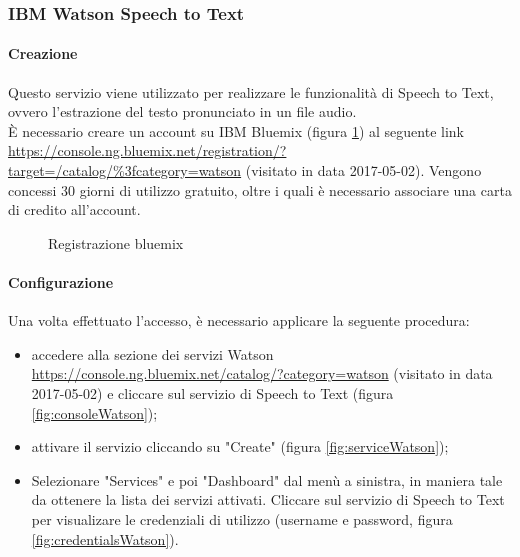 \subsubsection{IBM Watson Speech to Text}
\paragraph{Creazione}
Questo servizio viene utilizzato per realizzare le funzionalità di Speech to Text, ovvero l'estrazione del testo pronunciato in un file audio.\\
È necessario creare un account su IBM Bluemix (figura \ref{fig:bluemix}) al seguente link \url{https://console.ng.bluemix.net/registration/?target=/catalog/\%3fcategory=watson} (visitato in data 2017-05-02). Vengono concessi 30 giorni di utilizzo gratuito, oltre i quali è necessario associare una carta di credito all'account.
\begin{figure}[h]
	\caption{Registrazione bluemix}\label{fig:bluemix}
\end{figure}
\paragraph{Configurazione}
Una volta effettuato l'accesso, è necessario applicare la seguente procedura:
\begin{itemize}
	\item accedere alla sezione dei servizi Watson \url{https://console.ng.bluemix.net/catalog/?category=watson} (visitato in data 2017-05-02) e cliccare sul servizio di Speech to Text (figura \ref{fig:consoleWatson});
	\item attivare il servizio cliccando su "Create" (figura \ref{fig:serviceWatson});
	\item Selezionare "Services" e poi "Dashboard" dal menù a sinistra, in maniera tale da ottenere la lista dei servizi attivati. Cliccare sul servizio di Speech to Text per visualizare le credenziali di utilizzo (username e password, figura \ref{fig:credentialsWatson}).
\end{itemize}

